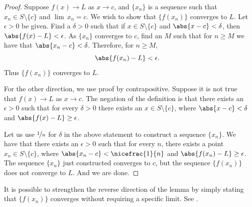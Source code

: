 \documentclass[12pt]{book}
\begin{document}
\begin{proof}
Suppose 
$f(x) \to L$ as $x \to c$, and $\{ x_n \}$ is a sequence
such that
$x_n \in S \setminus \{c\}$ and
$\lim\, x_n = c$.
We wish to show that $\{ f(x_n) \}$ converges to $L$.
Let $\epsilon > 0$ be given.
Find a $\delta > 0$ such that
if $x \in S \setminus \{c\}$ and $\abs{x-c} < \delta$, then
$\abs{f(x) - L} < \epsilon$.
As
$\{ x_n \}$  converges to $c$, find an $M$ such that for $n \geq M$
we have that $\abs{x_n - c} < \delta$.
Therefore, for $n \geq M$,
\begin{equation*}
\abs{f(x_n) - L} < \epsilon .
\end{equation*}
Thus $\{ f(x_n) \}$ converges to $L$.

For the other direction, we use proof by contrapositive.
Suppose 
it is not true that $f(x) \to L$ as $x \to c$.
The negation of the
definition is that there exists an $\epsilon > 0$ such that for every
$\delta > 0$ there exists an $x \in S \setminus \{c\}$, where
$\abs{x-c} < \delta$
and $\abs{f(x)-L} \geq \epsilon$.

Let us use $\nicefrac{1}{n}$ for $\delta$ in the above statement to
construct a sequence $\{ x_n \}$.
We have
that there exists an $\epsilon > 0$ such that for every $n$,
there exists a point $x_n \in S \setminus \{c\}$, where
$\abs{x_n-c} < \nicefrac{1}{n}$
and $\abs{f(x_n)-L} \geq \epsilon$.
The sequence $\{ x_n \}$ just constructed converges to $c$, but
the sequence $\{ f(x_n) \}$ does not converge to $L$.
And we are done.
\end{proof}

It is possible to strengthen the reverse direction of
the lemma by simply stating that
$\{ f(x_n) \}$ converges without requiring a specific limit.
See .
\end{document}
